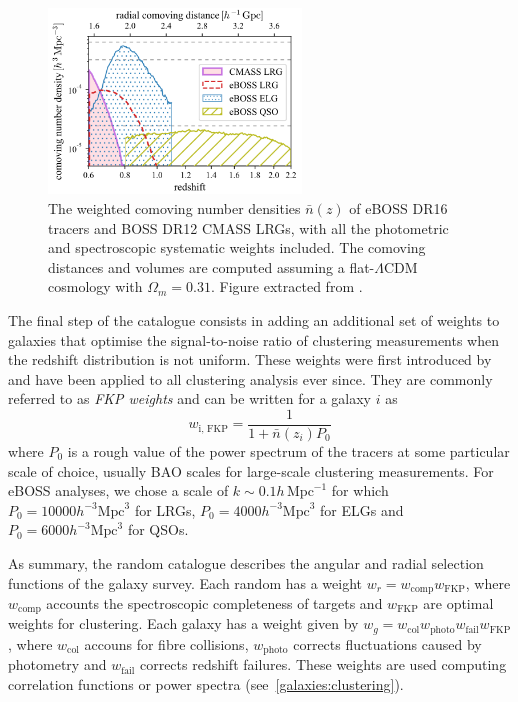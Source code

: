 \begin{figure}
    \centering 
    \includegraphics[width=0.6\textwidth]{fig/galaxies/eboss_z_distribution.png}
    \caption{ The weighted comoving number densities $\bar{n}(z)$ of eBOSS DR16 tracers
    and BOSS DR12 CMASS LRGs, with all the photometric and spectroscopic
    systematic weights included. 
    The comoving distances and volumes are computed assuming a flat-$\Lambda$CDM 
    cosmology with $\Omega_m = 0.31$. 
    Figure extracted from \cite{zhaoCompletedSDSSIVExtended2021}.} 
    \label{fig:eboss_z_distrib}
\end{figure}

The final step of the catalogue consists in adding an additional set of weights 
to galaxies that optimise the signal-to-noise ratio of clustering measurements 
when the redshift distribution is not uniform. These weights were first introduced 
by \cite{feldmanPowerSpectrumAnalysisThreedimensional1994} and have been applied 
to all clustering analysis ever since. They are commonly referred to as 
\emph{FKP weights} and can be written for a galaxy $i$ as
\begin{equation}
    w_\text{i, FKP} = \frac{1}{1 + \bar{n}(z_i)P_0}
\end{equation}
where $P_0$ is a rough value of the power spectrum of the tracers at some 
particular scale of choice, usually BAO scales for large-scale clustering measurements.
For eBOSS analyses, we chose a scale of $k \sim 0.1 h\, \text{Mpc}^{-1}$ for which 
$P_0 = 10000 h^{-3}\text{Mpc}^{3}$ for LRGs, 
$P_0 = 4000 h^{-3}\text{Mpc}^{3}$ for ELGs and 
$P_0 = 6000 h^{-3} \text{Mpc}^{3}$ for QSOs. 

As summary, the random catalogue describes the angular and radial selection functions
of the galaxy survey. 
Each random has a weight $w_r = w_\text{comp} w_\text{FKP}$, where $w_\text{comp}$ accounts
the spectroscopic completeness of targets and $w_\text{FKP}$ are optimal weights for clustering. 
Each galaxy has a weight given by $w_g = w_\text{col} w_\text{photo} w_\text{fail} w_\text{FKP}$,
where $w_\text{col}$ accouns for fibre collisions, $w_\text{photo}$ corrects fluctuations caused 
by photometry and $w_\text{fail}$ corrects redshift failures. 
These weights are used computing correlation functions or power spectra (see~\ref{galaxies:clustering}).

